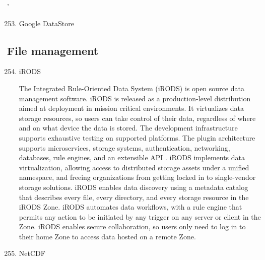 ’
\begin{enumerate}
\setcounter{enumi}{252}
\item {} 
Google DataStore

\end{enumerate}


\subsection{File management}
\label{\detokenize{i524/technologies:file-management}}\begin{enumerate}
\setcounter{enumi}{253}
\item {} 
iRODS

The Integrated Rule-Oriented Data System (iRODS) is open source
data management software. iRODS is released as a production-level
distribution aimed at deployment in mission critical
environments. It virtualizes data storage resources, so users can
take control of their data, regardless of where and on what
device the data is stored. The development infrastructure
supports exhaustive testing on supported platforms. The plugin
architecture supports microservices, storage systems,
authentication, networking, databases, rule engines, and an
extensible API \label{\detokenize{i524/technologies:id472}}{\hyperref[\detokenize{i524/technologies:irods-www}]{\sphinxcrossref{{[}405{]}}}}.  iRODS implements data
virtualization, allowing access to distributed storage assets
under a unified namespace, and freeing organizations from getting
locked in to single-vendor storage solutions. iRODS enables data
discovery using a metadata catalog that describes every file,
every directory, and every storage resource in the iRODS
Zone. iRODS automates data workflows, with a rule engine that
permits any action to be initiated by any trigger on any server
or client in the Zone. iRODS enables secure collaboration, so
users only need to log in to their home Zone to access data
hosted on a remote Zone. \label{\detokenize{i524/technologies:id473}}{\hyperref[\detokenize{i524/technologies:github-irods-www}]{\sphinxcrossref{{[}406{]}}}}

\item {} 
NetCDF


\end{enumerate}
